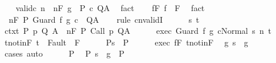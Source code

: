 \begin{isabellebody}
\ \ \isamarkupfalse%
\ valid{\isacharunderscore}c{\isacharcolon}\ {\isachardoublequoteopen}{\isasymAnd}n{\isachardot}\ {\isasymGamma}{\isacharcomma}{\isasymTheta}\ {\isasymTurnstile}n{\isacharcolon}\isactrlbsub {\isacharslash}F\isactrlesub \ {\isacharparenleft}g\ {\isasyminter}\ P{\isacharparenright}\ c\ Q{\isacharcomma}A{\isachardoublequoteclose}\ \isamarkupfalse%
\ fact\isanewline
\ \ \isamarkupfalse%
\ f{\isacharunderscore}F{\isacharcolon}\ {\isachardoublequoteopen}f\ {\isasymin}\ F{\isachardoublequoteclose}\ \isamarkupfalse%
\ fact\isanewline
\ \ \isamarkupfalse%
\ {\isachardoublequoteopen}{\isasymGamma}{\isacharcomma}{\isasymTheta}\ {\isasymTurnstile}n{\isacharcolon}\isactrlbsub {\isacharslash}F\isactrlesub \ P\ Guard\ f\ g\ c\ \ Q{\isacharcomma}A{\isachardoublequoteclose}\isanewline
\ \ \isamarkupfalse%
\ {\isacharparenleft}rule\ cnvalidI{\isacharparenright}\isanewline
\ \ \ \ \isamarkupfalse%
\ s\ t\isanewline
\ \ \ \ \isamarkupfalse%
\ ctxt{\isacharcolon}\ {\isachardoublequoteopen}{\isasymforall}{\isacharparenleft}P{\isacharcomma}\ p{\isacharcomma}\ Q{\isacharcomma}\ A{\isacharparenright}{\isasymin}{\isasymTheta}{\isachardot}\ {\isasymGamma}\ {\isasymTurnstile}n{\isacharcolon}\isactrlbsub {\isacharslash}F\isactrlesub \ P\ {\isacharparenleft}Call\ p{\isacharparenright}\ Q{\isacharcomma}A{\isachardoublequoteclose}\isanewline
\ \ \ \ \isamarkupfalse%
\ exec{\isacharcolon}\ {\isachardoublequoteopen}{\isasymGamma}{\isasymturnstile}{\isasymlangle}Guard\ f\ g\ c{\isacharcomma}Normal\ s{\isasymrangle}\ {\isacharequal}n{\isasymRightarrow}\ t{\isachardoublequoteclose}\isanewline
\ \ \ \ \isamarkupfalse%
\ t{\isacharunderscore}notin{\isacharunderscore}F{\isacharcolon}\ {\isachardoublequoteopen}t\ {\isasymnotin}\ Fault\ {\isacharbackquote}\ F{\isachardoublequoteclose}\isanewline
\ \ \ \ \isamarkupfalse%
\ P{\isacharcolon}{\isachardoublequoteopen}s\ {\isasymin}\ P{\isachardoublequoteclose}\isanewline
\ \ \ \ \isamarkupfalse%
\ exec\ f{\isacharunderscore}F\ t{\isacharunderscore}notin{\isacharunderscore}F\ \isamarkupfalse%
\ g{\isacharcolon}\ {\isachardoublequoteopen}s\ {\isasymin}\ g{\isachardoublequoteclose}\isanewline
\ \ \ \ \ \ \isamarkupfalse%
\ cases\ auto\isanewline
\ \ \ \ \isamarkupfalse%
\ P\ \isamarkupfalse%
\ P{\isacharprime}{\isacharcolon}\ {\isachardoublequoteopen}s\ {\isasymin}\ g\ {\isasyminter}\ P{\isachardoublequoteclose}\isanewline

\end{isabellebody}
